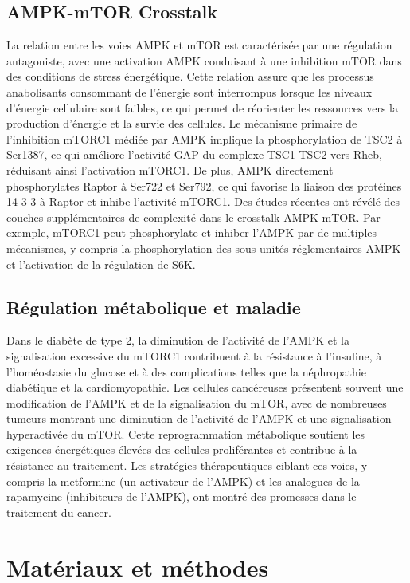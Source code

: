 \documentclass[11pt,a4paper]{article}
\begin{document}
\subsection{AMPK-mTOR Crosstalk}

La relation entre les voies AMPK et mTOR est caractérisée par une régulation antagoniste, avec une activation AMPK conduisant à une inhibition mTOR dans des conditions de stress énergétique. Cette relation assure que les processus anabolisants consommant de l'énergie sont interrompus lorsque les niveaux d'énergie cellulaire sont faibles, ce qui permet de réorienter les ressources vers la production d'énergie et la survie des cellules. Le mécanisme primaire de l'inhibition mTORC1 médiée par AMPK implique la phosphorylation de TSC2 à Ser1387, ce qui améliore l'activité GAP du complexe TSC1-TSC2 vers Rheb, réduisant ainsi l'activation mTORC1. De plus, AMPK directement phosphorylates Raptor à Ser722 et Ser792, ce qui favorise la liaison des protéines 14-3-3 à Raptor et inhibe l'activité mTORC1. Des études récentes ont révélé des couches supplémentaires de complexité dans le crosstalk AMPK-mTOR. Par exemple, mTORC1 peut phosphorylate et inhiber l'AMPK par de multiples mécanismes, y compris la phosphorylation des sous-unités réglementaires AMPK et l'activation de la régulation de S6K.

\subsection{Régulation métabolique et maladie}

Dans le diabète de type 2, la diminution de l'activité de l'AMPK et la signalisation excessive du mTORC1 contribuent à la résistance à l'insuline, à l'homéostasie du glucose et à des complications telles que la néphropathie diabétique et la cardiomyopathie. Les cellules cancéreuses présentent souvent une modification de l'AMPK et de la signalisation du mTOR, avec de nombreuses tumeurs montrant une diminution de l'activité de l'AMPK et une signalisation hyperactivée du mTOR. Cette reprogrammation métabolique soutient les exigences énergétiques élevées des cellules proliférantes et contribue à la résistance au traitement. Les stratégies thérapeutiques ciblant ces voies, y compris la metformine (un activateur de l'AMPK) et les analogues de la rapamycine (inhibiteurs de l'AMPK), ont montré des promesses dans le traitement du cancer.

\section{Matériaux et méthodes}
\end{document}
